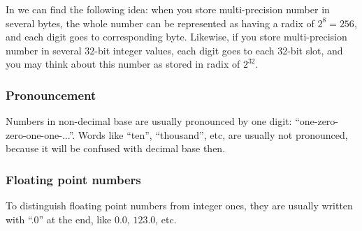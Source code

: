 In  we can find the following idea: when you store multi-precision number in several bytes,
the whole number can be represented as having a radix of $2^8=256$, and each digit goes to corresponding byte.
Likewise, if you store multi-precision number in several 32-bit integer values, each digit goes to each 32-bit slot,
and you may think about this number as stored in radix of $2^{32}$.

\subsubsection{Pronouncement}

Numbers in non-decimal base are usually pronounced by one digit: ``one-zero-zero-one-one-...''.
Words like ``ten'', ``thousand'', etc, are usually not pronounced, because it will be confused with decimal base then.

\subsubsection{Floating point numbers}

To distinguish floating point numbers from integer ones, they are usually written with ``.0'' at the end,
like $0.0$, $123.0$, etc.

